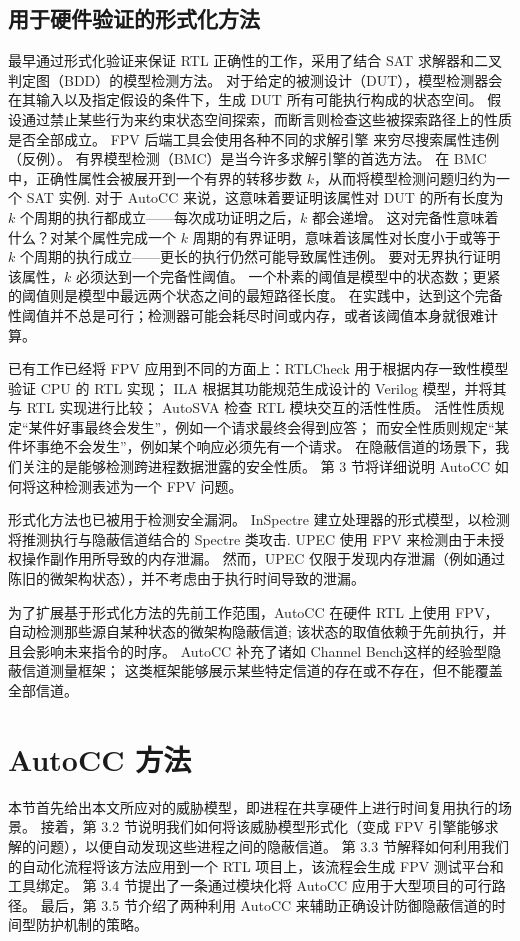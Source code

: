 \subsection{用于硬件验证的形式化方法}
最早通过形式化验证来保证 RTL 正确性的工作，采用了结合 SAT 求解器和二叉判定图（BDD）的模型检测方法。
对于给定的被测设计（DUT），模型检测器会在其输入以及指定假设的条件下，生成 DUT 所有可能执行构成的状态空间。
假设通过禁止某些行为来约束状态空间探索，而断言则检查这些被探索路径上的性质是否全部成立。
FPV 后端工具会使用各种不同的求解引擎 来穷尽搜索属性违例（反例）。
有界模型检测（BMC）是当今许多求解引擎的首选方法。
在 BMC 中，正确性属性会被展开到一个有界的转移步数 $k$，从而将模型检测问题归约为一个 SAT 实例.
对于 AutoCC 来说，这意味着要证明该属性对 DUT 的所有长度为 $k$ 个周期的执行都成立——每次成功证明之后，$k$ 都会递增。
这对完备性意味着什么？对某个属性完成一个 $k$ 周期的有界证明，意味着该属性对长度小于或等于 $k$ 个周期的执行成立——更长的执行仍然可能导致属性违例。
要对无界执行证明该属性，$k$ 必须达到一个完备性阈值。
一个朴素的阈值是模型中的状态数；更紧的阈值则是模型中最远两个状态之间的最短路径长度。
在实践中，达到这个完备性阈值并不总是可行；检测器可能会耗尽时间或内存，或者该阈值本身就很难计算。

已有工作已经将 FPV 应用到不同的方面上：RTLCheck 用于根据内存一致性模型验证 CPU 的 RTL 实现；
ILA 根据其功能规范生成设计的 Verilog 模型，并将其与 RTL 实现进行比较；
AutoSVA 检查 RTL 模块交互的活性性质。
活性性质规定“某件好事最终会发生”，例如一个请求最终会得到应答；
而安全性质则规定“某件坏事绝不会发生”，例如某个响应必须先有一个请求。
在隐蔽信道的场景下，我们关注的是能够检测跨进程数据泄露的安全性质。
第 3 节将详细说明 AutoCC 如何将这种检测表述为一个 FPV 问题。

形式化方法也已被用于检测安全漏洞。
InSpectre 建立处理器的形式模型，以检测将推测执行与隐蔽信道结合的 Spectre 类攻击.
UPEC 使用 FPV 来检测由于未授权操作副作用所导致的内存泄漏。
然而，UPEC 仅限于发现内存泄漏（例如通过陈旧的微架构状态），并不考虑由于执行时间导致的泄漏。

为了扩展基于形式化方法的先前工作范围，AutoCC 在硬件 RTL 上使用 FPV，自动检测那些源自某种状态的微架构隐蔽信道;
该状态的取值依赖于先前执行，并且会影响未来指令的时序。
AutoCC 补充了诸如 Channel Bench这样的经验型隐蔽信道测量框架；
这类框架能够展示某些特定信道的存在或不存在，但不能覆盖全部信道。

\section{AutoCC 方法}
本节首先给出本文所应对的威胁模型，即进程在共享硬件上进行时间复用执行的场景。
接着，第 3.2 节说明我们如何将该威胁模型形式化（变成 FPV 引擎能够求解的问题），以便自动发现这些进程之间的隐蔽信道。
第 3.3 节解释如何利用我们的自动化流程将该方法应用到一个 RTL 项目上，该流程会生成 FPV 测试平台和工具绑定。
第 3.4 节提出了一条通过模块化将 AutoCC 应用于大型项目的可行路径。
最后，第 3.5 节介绍了两种利用 AutoCC 来辅助正确设计防御隐蔽信道的时间型防护机制的策略。

